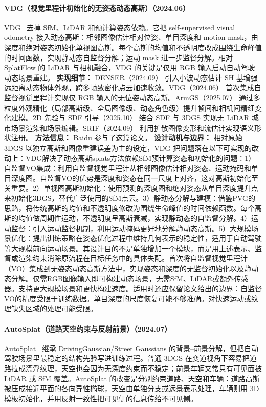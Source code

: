 \paragraph{VDG（视觉里程计初始化的无姿态动态高斯）（2024.06）}
VDG~\cite{2406_18198} 去掉 SfM、LiDAR 和预计算姿态依赖。它把 self-supervised visual odometry 接入动态高斯：相邻图像估计相对位姿、单目深度和 motion mask，由深度和绝对姿态初始化单视图高斯。每个高斯的均值和不透明度改成围绕生命峰值的时间函数，实现静动态自监督分解；运动 mask 进一步监督分解。相对 SplatFlow 的 LiDAR 与相机融合，VDG 的关键是仅用 RGB 输入启动自动驾驶动态场景重建。
\textbf{实现细节：} DENSER（2024.09） 引入小波动态估计 SH 基增强远距离动态物体外观，跨多帧致密化点云加速收敛。VDG（2024.06） 首次集成自监督视觉里程计实现仅 RGB 输入的无位姿动态高斯。ArmGS（2025.07） 通过多粒度外观精化（局部高斯级、全局图像级、动态角色级）提升帧间和相机间精细变化建模。2D 先验与 SDF 引导（2025.10） 结合 SDF 与 3DGS 实现无 LiDAR 城市场景渲染和场景编辑。SRIF（2024.09） 利用扩散图像变形和流估计实现语义形状注册。
\textbf{方法信息：} Baidu 参与了这篇论文。
\textbf{设计动机与边界：} 相对原始 3DGS 以独立高斯和图像重建误差为主的设定，VDG 把问题落在以下可实现的改动上：VDG解决了动态高斯splats方法依赖SfM预计算姿态和初始化的问题：1）自监督VO集成：利用自监督视觉里程计从相邻图像估计相对姿态、运动掩码和单目深度图。自监督VO的优势是深度和姿态在同一尺度上对齐，这对高斯初始化至关重要。2）单视图高斯初始化：使用预测的深度图和绝对姿态从单目深度提升点来初始化3DGS，替代广泛使用的SfM点云。3）静动态分解与建模：借鉴PVG的思路，将传统高斯的均值和不透明度修改为围绕生命峰值的时间依赖函数。每个高斯的均值做周期性运动，不透明度呈高斯衰减，实现静动态的自监督分解。4）运动监督：引入运动监督机制，利用运动掩码更好地分解静动态高斯。5）大规模场景优化：提出训练策略在姿态优化过程中维持几何表示的稳定性，适用于自动驾驶等大规模前向运动场景。其设计目的不是单独增加一个模块，而是用上述表示、监督或渲染约束消除原流程在目标任务中的具体失配。首次将自监督视觉里程计（VO）集成到无姿态动态高斯方法中，实现姿态和深度的无监督初始化以及静动态分解。仅需RGB图像输入即可构建动态场景，无需SfM、LiDAR或额外传感器。支持更大规模场景和更快构建速度。适用时还应保留论文给出的边界：自监督VO的精度受限于训练数据。单目深度的尺度恢复可能不够准确。对快速运动或纹理缺失区域的处理可能受限。
\paragraph{AutoSplat（道路天空约束与反射前景）（2024.07）}
AutoSplat~\cite{2407_02598} 继承 DrivingGaussian/Street Gaussians 的背景--前景分解，但把自动驾驶场景里最稳定的结构先验写进训练过程。普通 3DGS 在变道视角下容易把道路拉成漂浮纹理，天空也会因为无深度约束而不稳定；前景车辆又常只有可见面被 LiDAR 或 SfM 覆盖。AutoSplat 的改变是分别约束道路、天空和车辆：道路高斯被压成接近平面的各向异性椭球，天空由单独分支或远景表示处理，车辆则用 3D 模板初始化，并用反射一致性把可见侧的信息传给不可见侧。

